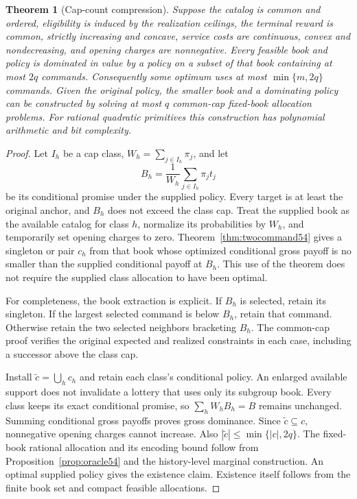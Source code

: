 \documentclass[11pt,letterpaper]{article}
\newtheorem{theorem}{Theorem}[section]
\theoremstyle{definition}\newtheorem{remark}[theorem]{Remark}
\begin{document}
\begin{theorem}[Cap-count compression]\label{thm:capcount56}
Suppose the catalog is common and ordered, eligibility is induced by the realization ceilings, the terminal reward is common, strictly increasing and concave, service costs are continuous, convex and nondecreasing, and opening charges are nonnegative. Every feasible book and policy is dominated in value by a policy on a subset of that book containing at most $2q$ commands. Consequently some optimum uses at most $\min\{m,2q\}$ commands. Given the original policy, the smaller book and a dominating policy can be constructed by solving at most $q$ common-cap fixed-book allocation problems. For rational quadratic primitives this construction has polynomial arithmetic and bit complexity.
\end{theorem}
\begin{proof}
Let $I_h$ be a cap class, $W_h=\sum_{j\in I_h}\pi_j$, and let
\[
 B_h=\frac{1}{W_h}\sum_{j\in I_h}\pi_jt_j
\]
be its conditional promise under the supplied policy. Every target is at least the original anchor, and $B_h$ does not exceed the class cap. Treat the supplied book as the available catalog for class $h$, normalize its probabilities by $W_h$, and temporarily set opening charges to zero. Theorem~\ref{thm:twocommand54} gives a singleton or pair $c_h$ from that book whose optimized conditional gross payoff is no smaller than the supplied conditional payoff at $B_h$. This use of the theorem does not require the supplied class allocation to have been optimal.

For completeness, the book extraction is explicit. If $B_h$ is selected, retain its singleton. If the largest selected command is below $B_h$, retain that command. Otherwise retain the two selected neighbors bracketing $B_h$. The common-cap proof verifies the original expected and realized constraints in each case, including a successor above the class cap.

Install $\widetilde c=\bigcup_h c_h$ and retain each class's conditional policy. An enlarged available support does not invalidate a lottery that uses only its subgroup book. Every class keeps its exact conditional promise, so $\sum_hW_hB_h=B$ remains unchanged. Summing conditional gross payoffs proves gross dominance. Since $\widetilde c\subseteq c$, nonnegative opening charges cannot increase. Also $|\widetilde c|\leq\min\{|c|,2q\}$. The fixed-book rational allocation and its encoding bound follow from Proposition~\ref{prop:oracle54} and the history-level marginal construction. An optimal supplied policy gives the existence claim. Existence itself follows from the finite book set and compact feasible allocations.
\end{proof}
\end{document}
